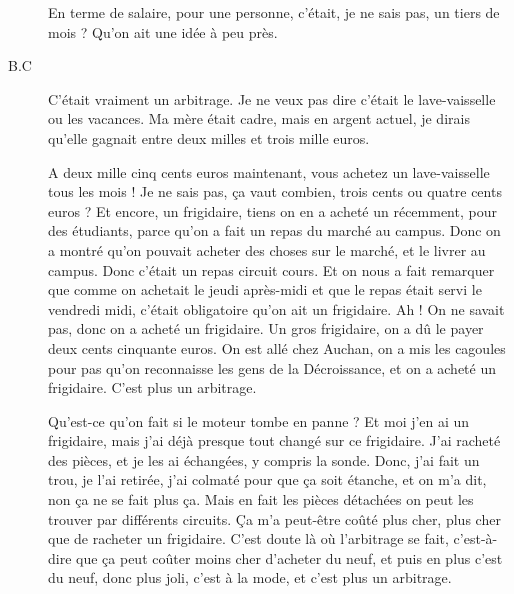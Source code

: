 \begin{description}
\vspace{1\baselineskip}

En terme de salaire, pour une personne, c'était, je ne sais pas, un tiers de mois ? Qu'on ait une idée à peu près.

\vspace{1\baselineskip}

\item[B.C]C'était vraiment un arbitrage. Je ne veux pas dire c'était le lave-vaisselle ou les vacances. Ma mère était cadre, mais en argent actuel, je dirais qu'elle gagnait entre deux milles et trois mille euros. 

A deux mille cinq cents euros maintenant, vous achetez un lave-vaisselle tous les mois ! Je ne sais pas, ça vaut combien, trois cents ou quatre cents euros ? Et encore, un frigidaire, tiens on en a acheté un récemment, pour des étudiants, parce qu’on a fait un repas du marché au campus. Donc on a montré qu'on pouvait acheter des choses sur le marché, et le livrer au campus. Donc c'était un repas circuit cours. Et on nous a fait remarquer que comme on achetait le jeudi après-midi  et que le repas était servi le vendredi midi, c'était obligatoire qu'on ait un frigidaire. Ah ! On ne savait pas, donc on a acheté un frigidaire. Un gros frigidaire, on a dû le payer deux cents cinquante euros. On est allé chez Auchan, on a mis les cagoules pour pas qu'on reconnaisse les gens de la Décroissance, et on a acheté un frigidaire. C'est plus un arbitrage. 

Qu'est-ce qu'on fait si le moteur tombe en panne ? Et moi j'en ai un frigidaire, mais j'ai déjà presque tout changé sur ce frigidaire. J'ai racheté des pièces, et je les ai échangées, y compris la sonde. Donc, j'ai fait un trou, je l'ai retirée, j'ai colmaté pour que ça soit étanche, et on m'a dit, non ça ne se fait plus ça. Mais en fait les pièces détachées on peut les trouver par différents circuits. Ça m'a peut-être coûté plus cher, plus cher que de racheter un frigidaire. C'est doute là où l'arbitrage se fait, c'est-à-dire que ça peut coûter moins cher d'acheter du neuf, et puis en plus c'est du neuf, donc plus joli, c'est à la mode, et c'est plus un arbitrage. 


\end{description}
